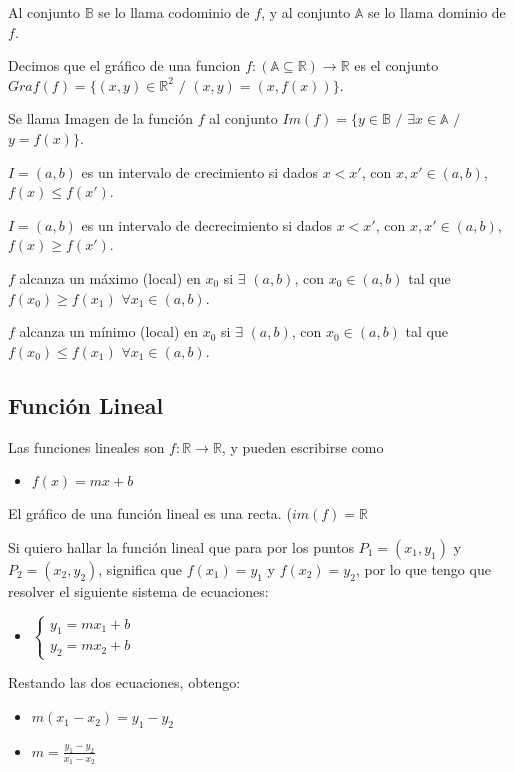 \documentclass[%
 aip,
 jmp,%
 amsmath,amssymb,
 reprint,%
]{revtex4-1}
\begin{document}
Al conjunto $\mathbb{B}$ se lo llama codominio de $f$, y al conjunto $\mathbb{A}$ se lo llama dominio de $f$.

Decimos que el gráfico de una funcion $f: (\mathbb{A} \subseteq \mathbb{R}) \rightarrow \mathbb{R}$ es el conjunto $Graf(f)=\{(x,y)\in \mathbb{R}^2$ $ /$ $ (x,y)=(x,f(x))\}$.

Se llama Imagen de la función $f$ al conjunto $Im(f)=\{y \in \mathbb{B}$ $/$ $\exists x \in \mathbb{A}$ $/$ $y=f(x)\}$.

$I=(a,b)$ es un intervalo de crecimiento si dados $x<x'$, con $x,x' \in (a,b)$, $f(x) \leq f(x')$.

$I=(a,b)$ es un intervalo de decrecimiento si dados $x<x'$, con $x,x' \in (a,b)$, $f(x) \geq f(x')$.

$f$ alcanza un máximo (local) en $x_0$ si $\exists$ $(a,b)$, con $x_0 \in (a,b)$ tal que $f(x_0) \geq f(x_1)$ $\forall x_1 \in (a,b)$.

$f$ alcanza un mínimo (local) en $x_0$ si $\exists$ $(a,b)$, con $x_0 \in (a,b)$ tal que $f(x_0) \leq f(x_1)$ $\forall x_1 \in (a,b)$.

\subsection{Función Lineal}
Las funciones lineales son $f: \mathbb{R} \rightarrow \mathbb{R}$, y pueden escribirse como
\begin{itemize}
\item $f(x)= m  x + b$
\end{itemize}

El gráfico de una función lineal es una recta. ($im(f)=\mathbb{R}$

Si quiero hallar la función lineal que para por los puntos $P_1=(x_1,y_1)$ y $P_2=(x_2,y_2)$, significa que $f(x_1)=y_1$ y $f(x_2)=y_2$, por lo que tengo que resolver el siguiente sistema de ecuaciones:

\begin{itemize}
\item $\left\{
 \begin{array}{lr}
  y_1 = m  x_1 + b \\
  y_2 = m  x_2 + b
 \end{array}
 \right.$
 \end{itemize}
 
 Restando las dos ecuaciones, obtengo:
 \begin{itemize}
 \item $m(x_1 - x_2) = y_1 - y_2$
 \item $m = \frac{y_1 - y_2}{x_1 - x_2}$
 \end{itemize} 
 
\end{document}
